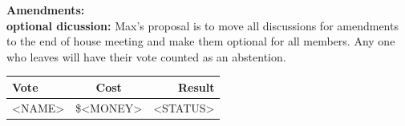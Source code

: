 \documentclass[9pt]{extarticle} %
\begin{document}
\begin{minipage}[t]{.35\linewidth}
\begin{mdframed}[style=sidebar,frametitle={}]

\textbf{Amendments:} \\
\textbf{optional dicussion:} Max's proposal is to move all discussions for amendments
to the end of house meeting and make them optional for all members. Any one who
leaves will have their vote counted as an abstention.
\\


\begin{tabular}{lcr}

Vote & Cost & Result \\
\midrule
<NAME> & \$<MONEY> & <STATUS> \\
\bottomrule
\end{tabular}


\end{mdframed}
\end{minipage}\hfill %
%
%
\end{document}
